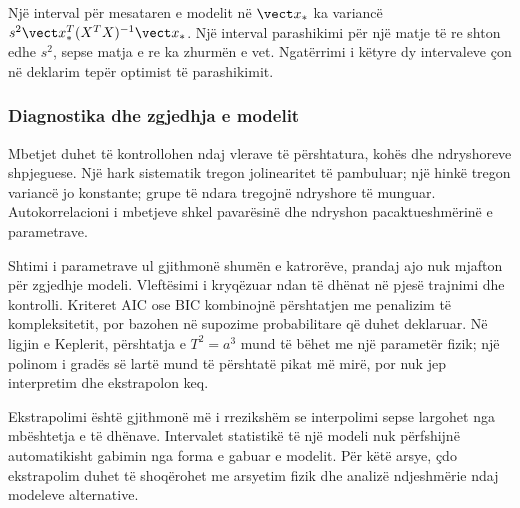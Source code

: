 Një interval për mesataren e modelit në $\vect x_*$ ka variancë $s^2\vect x_*^T(X^TX)^{-1}\vect x_*$. Një interval parashikimi për një matje të re shton edhe $s^2$, sepse matja e re ka zhurmën e vet. Ngatërrimi i këtyre dy intervaleve çon në deklarim tepër optimist të parashikimit.

\subsubsection{Diagnostika dhe zgjedhja e modelit}
Mbetjet duhet të kontrollohen ndaj vlerave të përshtatura, kohës dhe ndryshoreve shpjeguese. Një hark sistematik tregon jolinearitet të pambuluar; një hinkë tregon variancë jo konstante; grupe të ndara tregojnë ndryshore të munguar. Autokorrelacioni i mbetjeve shkel pavarësinë dhe ndryshon pacaktueshmërinë e parametrave.

Shtimi i parametrave ul gjithmonë shumën e katrorëve, prandaj ajo nuk mjafton për zgjedhje modeli. Vleftësimi i kryqëzuar ndan të dhënat në pjesë trajnimi dhe kontrolli. Kriteret AIC ose BIC kombinojnë përshtatjen me penalizim të kompleksitetit, por bazohen në supozime probabilitare që duhet deklaruar. Në ligjin e Keplerit, përshtatja e $T^2=a^3$ mund të bëhet me një parametër fizik; një polinom i gradës së lartë mund të përshtatë pikat më mirë, por nuk jep interpretim dhe ekstrapolon keq.

Ekstrapolimi është gjithmonë më i rrezikshëm se interpolimi sepse largohet nga mbështetja e të dhënave. Intervalet statistikë të një modeli nuk përfshijnë automatikisht gabimin nga forma e gabuar e modelit. Për këtë arsye, çdo ekstrapolim duhet të shoqërohet me arsyetim fizik dhe analizë ndjeshmërie ndaj modeleve alternative.
